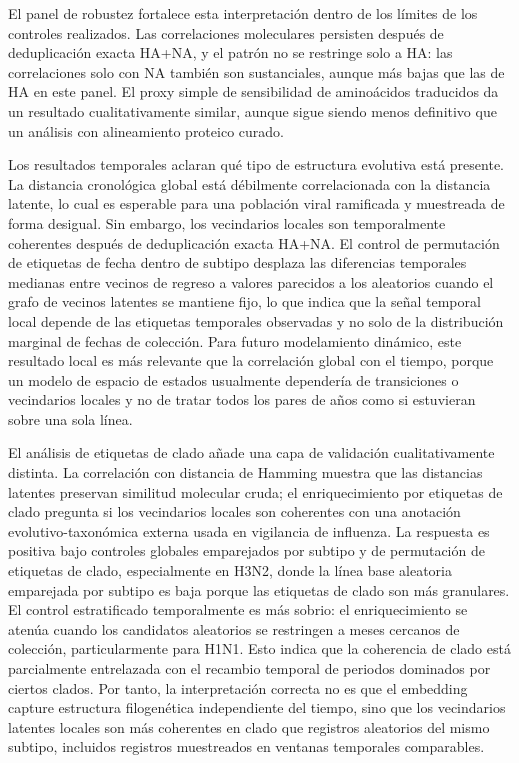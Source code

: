 \documentclass[11pt]{article}
\begin{document}
El panel de robustez fortalece esta interpretación dentro de los límites de los controles realizados. Las correlaciones moleculares persisten después de deduplicación exacta HA+NA, y el patrón no se restringe solo a HA: las correlaciones solo con NA también son sustanciales, aunque más bajas que las de HA en este panel. El proxy simple de sensibilidad de aminoácidos traducidos da un resultado cualitativamente similar, aunque sigue siendo menos definitivo que un análisis con alineamiento proteico curado.

Los resultados temporales aclaran qué tipo de estructura evolutiva está presente. La distancia cronológica global está débilmente correlacionada con la distancia latente, lo cual es esperable para una población viral ramificada y muestreada de forma desigual. Sin embargo, los vecindarios locales son temporalmente coherentes después de deduplicación exacta HA+NA. El control de permutación de etiquetas de fecha dentro de subtipo desplaza las diferencias temporales medianas entre vecinos de regreso a valores parecidos a los aleatorios cuando el grafo de vecinos latentes se mantiene fijo, lo que indica que la señal temporal local depende de las etiquetas temporales observadas y no solo de la distribución marginal de fechas de colección. Para futuro modelamiento dinámico, este resultado local es más relevante que la correlación global con el tiempo, porque un modelo de espacio de estados usualmente dependería de transiciones o vecindarios locales y no de tratar todos los pares de años como si estuvieran sobre una sola línea.

El análisis de etiquetas de clado añade una capa de validación cualitativamente distinta. La correlación con distancia de Hamming muestra que las distancias latentes preservan similitud molecular cruda; el enriquecimiento por etiquetas de clado pregunta si los vecindarios locales son coherentes con una anotación evolutivo-taxonómica externa usada en vigilancia de influenza. La respuesta es positiva bajo controles globales emparejados por subtipo y de permutación de etiquetas de clado, especialmente en H3N2, donde la línea base aleatoria emparejada por subtipo es baja porque las etiquetas de clado son más granulares. El control estratificado temporalmente es más sobrio: el enriquecimiento se atenúa cuando los candidatos aleatorios se restringen a meses cercanos de colección, particularmente para H1N1. Esto indica que la coherencia de clado está parcialmente entrelazada con el recambio temporal de periodos dominados por ciertos clados. Por tanto, la interpretación correcta no es que el embedding capture estructura filogenética independiente del tiempo, sino que los vecindarios latentes locales son más coherentes en clado que registros aleatorios del mismo subtipo, incluidos registros muestreados en ventanas temporales comparables.
\end{document}

